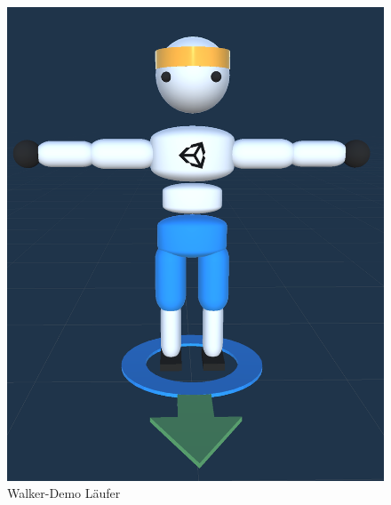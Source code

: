 \begin{figure}[H]
  \centering  
  \includegraphics[scale=0.35]{img/charakter_walker}
  \caption{Walker-Demo Läufer}
  \label{fig:charakter_walker}
\end{figure}

